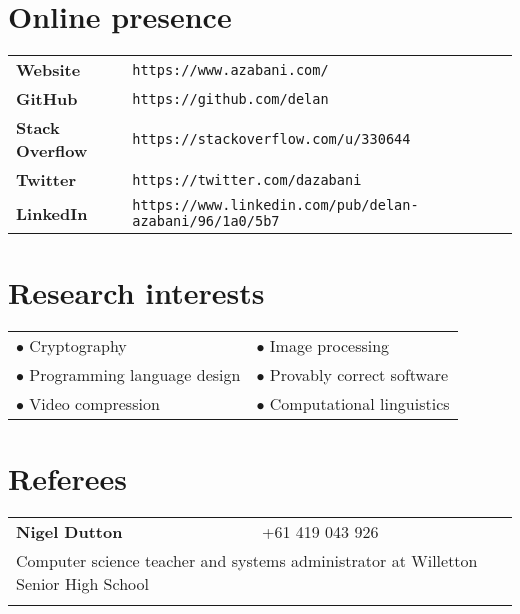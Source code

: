 \documentclass[a4paper,12pt]{article}
\begin{document}
\newpage

\section*{Online presence}

\begin{tabular}{p{3.5cm}p{12.5cm}}
	\textbf{Website} &
		\texttt{https://www.azabani.com/}\\
	\textbf{GitHub} &
		\texttt{https://github.com/delan}\\
	\textbf{Stack Overflow} &
		\texttt{https://stackoverflow.com/u/330644}\\
	\textbf{Twitter} &
		\texttt{https://twitter.com/dazabani}\\
	\textbf{LinkedIn} &
		\texttt{https://www.linkedin.com/pub/delan-azabani/96/1a0/5b7}
\end{tabular}

\section*{Research interests}

\begin{tabular}{p{8cm}p{8cm}}
	$\bullet$ Cryptography &
	$\bullet$ Image processing \\
	$\bullet$ Programming language design &
	$\bullet$ Provably correct software \\
	$\bullet$ Video compression &
	$\bullet$ Computational linguistics
\end{tabular}

\section*{Referees}

\begin{tabular}{p{3.5cm}p{12.5cm}}
	\textbf{Nigel Dutton} &
		+61 419 043 926\\
	\multicolumn{2}{p{17cm}}{
		Computer science teacher and systems administrator
		at Willetton Senior High School
	}\\\\
\end{tabular}
\end{document}
